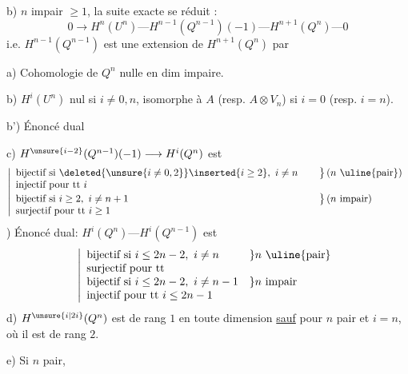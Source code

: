 b) $n$ impair $\geq1$, la suite exacte se réduit :
\[
0\longrightarrow H^n(U^n)\text{---}H^{n-1}(Q^{n-1})(-1)\text{---}H^{n+1}(Q^n)\text{---}0
\]
i.e. $H^{n-1}(Q^{n-1})$ est une extension de $H^{n+1}(Q^n)$ par

a) Cohomologie de $Q^n$ nulle en dim impaire.

b) $H^i(U^n)$ nul si $i\neq0,n$, isomorphe à $A$ (resp. $A\otimes V_n$) si $i=0$ (resp. $i=n$).

b') Énoncé dual

c) $H^{\unsure{i-2}}(Q^{n-1})(-1)\longrightarrow H^i(Q^n)$ est
\[
\left|\begin{array}{ll}
\text{bijectif si }\deleted{\unsure{i\neq0,2}}\inserted{i\geq2},\ i\neq n&
\left.\begin{array}{l}\\ \end{array}\right\}(n\text{ \uline{pair}})\\
\text{injectif pour tt }i&\\[2pt]
\text{bijectif si }i\geq2,\ i\neq n+1&
\left.\begin{array}{l}\\ \end{array}\right\}(n\text{ impair})\\
\text{surjectif pour tt }i\geq1&
\end{array}\right.
\]
) Énoncé dual: $H^i(Q^n)\text{---}H^i(Q^{n-1})$ est
\[
\left|\begin{array}{ll}
\text{bijectif si }i\leq2n-2,\ i\neq n&\}n\text{ \uline{pair}}\\
\text{surjectif pour tt}&\\
\text{bijectif si }i\leq2n-2,\ i\neq n-1&\}n\text{ impair}\\
\text{injectif pour tt }i\leq2n-1&
\end{array}\right.
\]
d) $H^{\unsure{i|2i}}(Q^n)$  est de rang $1$ en toute dimension  \uline{sauf} pour $n$ pair et  $i=n$, où il est de rang $2$.

e) Si $n$ pair,


